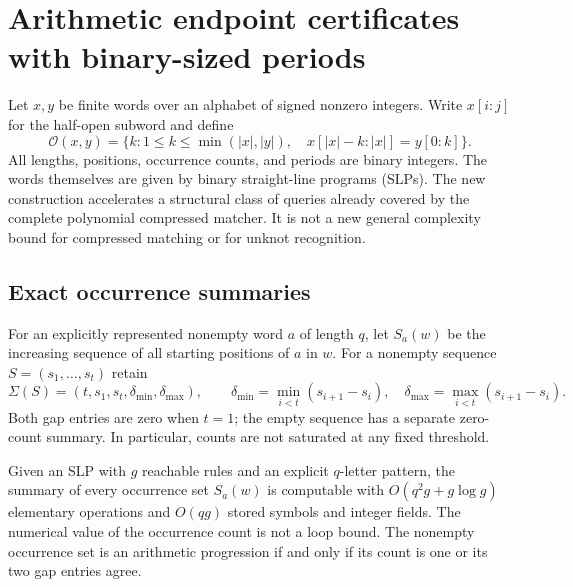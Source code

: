
\section{Arithmetic endpoint certificates with binary-sized periods}

Let $x,y$ be finite words over an alphabet of signed nonzero integers.  Write
$x[i:j]$ for the half-open subword and define
\[
 \mathcal O(x,y)=\{k:1\leq k\leq\min(|x|,|y|),\quad
 x[|x|-k:|x|]=y[0:k]\}.
\]
All lengths, positions, occurrence counts, and periods are binary integers.
The words themselves are given by binary straight-line programs (SLPs).
The new construction accelerates a structural class of queries already
covered by the complete polynomial compressed matcher.  It is not a new
general complexity bound for compressed matching or for unknot recognition.

\subsection{Exact occurrence summaries}

For an explicitly represented nonempty word $a$ of length $q$, let
$S_a(w)$ be the increasing sequence of all starting positions of $a$ in $w$.
For a nonempty sequence $S=(s_1,\ldots,s_t)$ retain
\[
 \Sigma(S)=(t,s_1,s_t,\delta_{\min},\delta_{\max}),\qquad
 \delta_{\min}=\min_{i<t}(s_{i+1}-s_i),\quad
 \delta_{\max}=\max_{i<t}(s_{i+1}-s_i).
\]
Both gap entries are zero when $t=1$; the empty sequence has a separate
zero-count summary.  In particular, counts are not saturated at any fixed
threshold.

\begin{lemma}
Given an SLP with $g$ reachable rules and an explicit $q$-letter pattern,
the summary of every occurrence set $S_a(w)$ is computable with
$O(q^2g+g\log g)$ elementary operations and $O(qg)$ stored symbols and
integer fields.  The numerical value of the occurrence count is not a loop
bound.  The nonempty occurrence set is an arithmetic progression if and only
if its count is one or its two gap entries agree.
\end{lemma}

